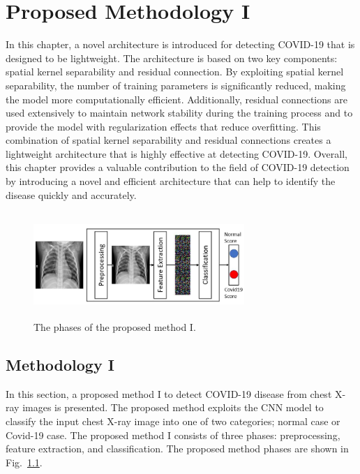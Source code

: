 
\chapter{Proposed Methodology I} %

\label{chp:proposed1} %
In this chapter, a novel architecture is introduced for detecting COVID-19 that is designed to be lightweight. The architecture is based on two key components: spatial kernel separability and residual connection. By exploiting spatial kernel separability, the number of training parameters is significantly reduced, making the model more computationally efficient. Additionally, residual connections are used extensively to maintain network stability during the training process and to provide the model with regularization effects that reduce overfitting. This combination of spatial kernel separability and residual connections creates a lightweight architecture that is highly effective at detecting COVID-19. Overall, this chapter provides a valuable contribution to the field of COVID-19 detection by introducing a novel and efficient architecture that can help to identify the disease quickly and accurately. 

\begin{figure}[th]
    \centering
    \includegraphics[height=40mm,width=8.0cm]{Figures/fig1.jpg}
    \caption{The phases of the proposed method I.}
    \label{fig1}
    \end{figure}

\section{Methodology I}
In this section, a  proposed method I to detect COVID-19 disease from chest X-ray images is presented. The proposed method exploits the CNN model to classify the input chest X-ray image into one of two categories; normal case or Covid-19 case. The proposed method I consists of three phases: preprocessing, feature extraction, and classification. The proposed method phases are shown in Fig.~\ref{fig1}. 

